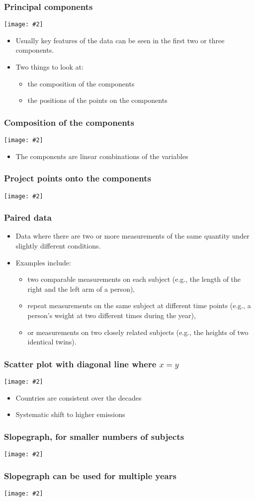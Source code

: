\documentclass{beamer}
\newcommand{\bi}{\begin{itemize}}
\newcommand{\li}{\item}
\newcommand{\ei}{\end{itemize}}
\newcommand{\fig}[2]{\centerline{\texttt{[image: \#2]}}}
\newcommand{\bfr}[1]{\begin{frame}[fragile]\frametitle{{ #1 }}}
\begin{document}
\bfr{Principal components}
\fig{1}{blue-jays-PCA-1.png}
\bi
\li Usually key features of the data can be seen in
the first two or three components.
\li Two things to look at:
\bi
\li the composition of the components
\li the positions of the points on the components
\ei
\ei
\end{frame}

\bfr{Composition of the components}
\fig{.65}{forensic-PCA-rotation-1.png}
\bi
\li The components are linear combinations of the variables
\ei
\end{frame}

\bfr{Project points onto the components}
\fig{1}{forensic-PCA-1.png}
\end{frame}

\bfr{Paired data}
\bi
\li Data where there are two or more measurements of the same quantity under slightly different conditions.
\li Examples include:
\bi
\li two comparable measurements on each subject (e.g., the length of the right and the left arm of a person), 
\li repeat measurements on the same subject at different time points (e.g., a person’s weight at two different times during the year),
\li or measurements on two closely related subjects (e.g., the heights of two identical twins). 
\ei
\ei
\end{frame}

\bfr{Scatter plot with diagonal line where $x=y$}
\fig{.7}{CO2-paired-scatter-1.png}
\bi
\li Countries are consistent over the decades
\li Systematic shift to higher emissions
\ei
\end{frame}

\bfr{Slopegraph, for smaller numbers of subjects}
\fig{.7}{CO2-slopegraph-1.png}
\end{frame}

\bfr{Slopegraph can be used for multiple years}
\fig{.7}{CO2-slopegraph-three-year-1.png}
\end{frame}
\end{document}

